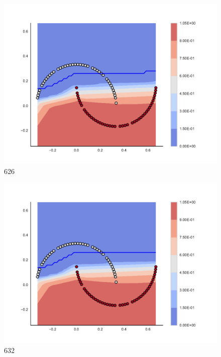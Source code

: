 \begin{subfigure}[b]{0.09\textwidth}
    \includegraphics[clip, trim=2.35cm 1.75cm 4.5cm 0cm,width=\textwidth]{img/convergence/626.pdf}
    \caption{626}
    \label{fig:convergence_626}
\end{subfigure}
%
\begin{subfigure}[b]{0.09\textwidth}
    \includegraphics[clip, trim=2.35cm 1.75cm 4.5cm 0cm,width=\textwidth]{img/convergence/632.pdf}
    \caption{632}
    \label{fig:convergence_632}
\end{subfigure}
%
